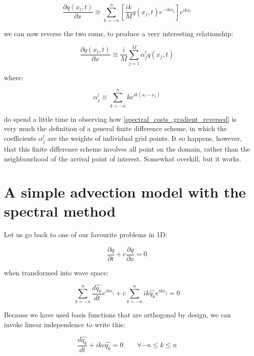 \begin{equation}
	\frac{\partial	q(x_l,t)} {\partial x} \cong   \sum_{k=-n}^{n} \left[  \frac{ik}{M}  q(x_j,t) e^{-ikx_j} \right] e^{ikx_l}
	\label{spectral_costs_gradient}
\end{equation}

we can now reverse the two sums, to produce a very interesting relationship:

\begin{equation}
	\frac{\partial	q(x_l,t)} {\partial x} \cong   \frac{i}{M}  \sum_{j=1}^{M}  \alpha_j^l  q(x_j,t)
	\label{spectral_costs_gradient_reversed}
\end{equation}

where:

\begin{equation} 
	\alpha_j^l \equiv \sum_{k=-n}^{n}  k  e^{ik (x_l-x_j)} 
	\label{gradient_coefficients}
\end{equation}

do spend a little time in observing how \ref{spectral_costs_gradient_reversed} is very much the definition of a general finite difference scheme, in which the coefficients $\alpha_j^l$ are the weights of individual grid points. It so happens, however, that this finite difference scheme involves all point on the domain, rather than the neighbourhood of the arrival point of interest. Somewhat overkill, but it works.

\section{A simple advection model with the spectral method}
Let us go back to one of our favourite problems in 1D:

\begin{equation}
	\frac{\partial q}{\partial t} + c 	\frac{\partial q}{\partial x} = 0
\end{equation}

when transformed into wave space:

\begin{equation}
  \sum_{k=-n}^{n} 	\frac{d \widehat{q_k}}{d t}  e^{ikx_j}+ c  \sum_{k=-n}^{n} 	ik \widehat{q_k} e^{ikx_j}= 0
\end{equation}

Because we have used basis functions that are orthogonal by design, we can invoke linear independence to write this:

\begin{equation}
	\frac{d \widehat{q_k}}{d t}  + ikc   \widehat{q_k} = 0  \qquad  \forall -n \le k \le n
	\label{spectral_linear_advection}
\end{equation}


